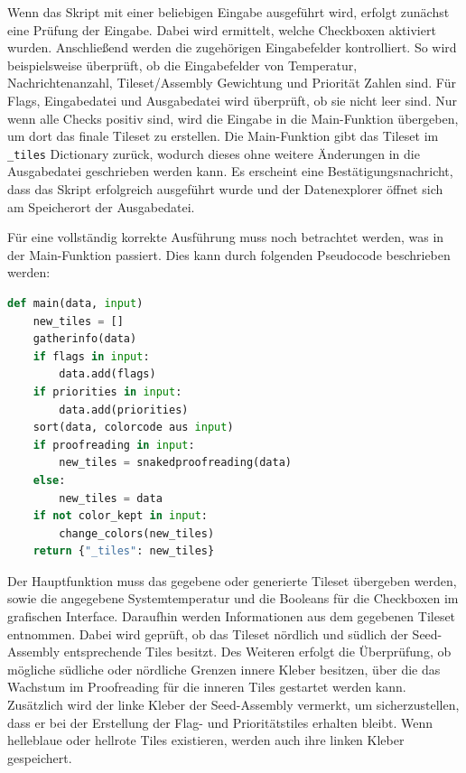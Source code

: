 Wenn das Skript mit einer beliebigen Eingabe ausgeführt wird, erfolgt zunächst eine Prüfung der Eingabe. Dabei wird ermittelt, welche Checkboxen aktiviert wurden. Anschließend werden die zugehörigen Eingabefelder kontrolliert. So wird beispielsweise überprüft, ob die Eingabefelder von Temperatur, Nachrichtenanzahl, Tileset/Assembly Gewichtung und Priorität Zahlen sind. Für Flags, Eingabedatei und Ausgabedatei wird überprüft, ob sie nicht leer sind. Nur wenn alle Checks positiv sind, wird die Eingabe in die Main-Funktion übergeben, um dort das finale Tileset zu erstellen. Die Main-Funktion gibt das Tileset im \texttt{\_tiles} Dictionary zurück, wodurch dieses ohne weitere Änderungen in die Ausgabedatei geschrieben werden kann. Es erscheint eine Bestätigungsnachricht, dass das Skript erfolgreich ausgeführt wurde und der Datenexplorer öffnet sich am Speicherort der Ausgabedatei.

Für eine vollständig korrekte Ausführung muss noch betrachtet werden, was in der Main-Funktion passiert. Dies kann durch folgenden Pseudocode beschrieben werden: 
\begin{lstlisting}[language=python, caption={[Pseudocode der Main-Funktion des Skripts]{Pseudocode der Main-Funktion des Skripts. Es wird je nach Input eine Menge von Tiles erstellt, die für die Ausgabe vorbereitet werden. Dabei werden Informationen gesammelt, die im Code genutzt werden, um ein korrekt funktionierendes Tileset zu garantieren. Wurden in der GUI bestimmte Checkboxen aktiviert, so werden dementsprechend Flag-, Prioritäts- und Proofreadingtiles generiert.}}, label=lst:main]
def main(data, input)      
    new_tiles = []
    gatherinfo(data)
    if flags in input:
        data.add(flags)
    if priorities in input:
        data.add(priorities)
    sort(data, colorcode aus input)
    if proofreading in input:
        new_tiles = snakedproofreading(data)
    else:
        new_tiles = data 
    if not color_kept in input: 
        change_colors(new_tiles)
    return {"_tiles": new_tiles}
\end{lstlisting}

Der Hauptfunktion muss das gegebene oder generierte Tileset übergeben werden, sowie die angegebene Systemtemperatur und die Booleans für die Checkboxen im grafischen Interface. Daraufhin werden Informationen aus dem gegebenen Tileset entnommen. Dabei wird geprüft, ob das Tileset nördlich und südlich der Seed-Assembly entsprechende Tiles besitzt. Des Weiteren erfolgt die Überprüfung, ob mögliche südliche oder nördliche Grenzen innere Kleber besitzen, über die das Wachstum im Proofreading für die inneren Tiles gestartet werden kann. Zusätzlich wird der linke Kleber der Seed-Assembly vermerkt, um sicherzustellen, dass er bei der Erstellung der Flag- und Prioritätstiles erhalten bleibt. Wenn helleblaue oder hellrote Tiles existieren, werden auch ihre linken Kleber gespeichert.


